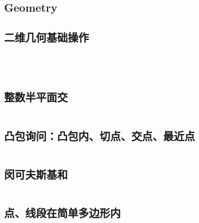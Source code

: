 \documentclass[titlepage, a4paper]{article}
\begin{document}
	\begin{titlepage}
		
	\end{titlepage}
	\begin{multicols}{2}
		\setcounter{tocdepth}{3}
		\begingroup
		\let\cleardoublepage\relax
		\let\clearpage\relax
		\begin{small}
		\begin{spacing}{0.70}
		\tableofcontents
		\end{spacing}
		\end{small}
		\begin{spacing}{0.6}
			
			\section{Geometry}
				\subsection{二维几何基础操作}
					\inputminted{cpp}{src/Geometry/凸包.cpp}
					\inputminted{cpp}{src/Geometry/geo.cpp}
					\inputminted{cpp}{src/Geometry/far_pair.cpp}
					\inputminted{cpp}{src/Geometry/半平面交.cpp}
				\subsection{整数半平面交}
					\inputminted{cpp}{src/Geometry/integral_hpi.cpp}
				\subsection{凸包询问：凸包内、切点、交点、最近点}
					\inputminted{cpp}{src/Geometry/convex_findmax.cpp}
				

				\subsection{闵可夫斯基和}
					\inputminted{cpp}{src/Geometry/闵可夫斯基和.cpp}
				
				 \subsection{点、线段在简单多边形内}
					\inputminted{cpp}{src/Geometry/AirportConstruction.cpp}
				

\end{spacing}
\end{multicols}
\end{document}
